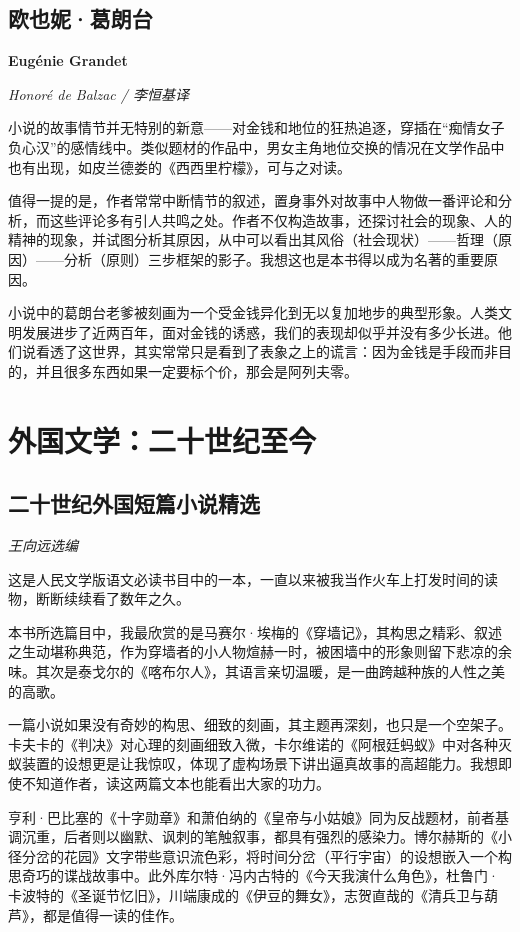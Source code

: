 \subsection*{欧也妮·葛朗台}
\par \textbf{Eugénie Grandet}
\par \emph{Honoré de Balzac / 李恒基译} 
\par 小说的故事情节并无特别的新意——对金钱和地位的狂热追逐，穿插在“痴情女子负心汉”的感情线中。类似题材的作品中，男女主角地位交换的情况在文学作品中也有出现，如皮兰德娄的《西西里柠檬》，可与之对读。
\par 值得一提的是，作者常常中断情节的叙述，置身事外对故事中人物做一番评论和分析，而这些评论多有引人共鸣之处。作者不仅构造故事，还探讨社会的现象、人的精神的现象，并试图分析其原因，从中可以看出其风俗（社会现状）——哲理（原因）——分析（原则）三步框架的影子。我想这也是本书得以成为名著的重要原因。
\par 小说中的葛朗台老爹被刻画为一个受金钱异化到无以复加地步的典型形象。人类文明发展进步了近两百年，面对金钱的诱惑，我们的表现却似乎并没有多少长进。他们说看透了这世界，其实常常只是看到了表象之上的谎言：因为金钱是手段而非目的，并且很多东西如果一定要标个价，那会是阿列夫零。
\par {}

\section{外国文学：二十世纪至今}

\subsection*{二十世纪外国短篇小说精选}
\par \emph{王向远选编}

\par 这是人民文学版语文必读书目中的一本，一直以来被我当作火车上打发时间的读物，断断续续看了数年之久。
\par 本书所选篇目中，我最欣赏的是马赛尔·埃梅的《穿墙记》，其构思之精彩、叙述之生动堪称典范，作为穿墙者的小人物煊赫一时，被困墙中的形象则留下悲凉的余味。其次是泰戈尔的《喀布尔人》，其语言亲切温暖，是一曲跨越种族的人性之美的高歌。
\par 一篇小说如果没有奇妙的构思、细致的刻画，其主题再深刻，也只是一个空架子。卡夫卡的《判决》对心理的刻画细致入微，卡尔维诺的《阿根廷蚂蚁》中对各种灭蚁装置的设想更是让我惊叹，体现了虚构场景下讲出逼真故事的高超能力。我想即使不知道作者，读这两篇文本也能看出大家的功力。
\par 亨利·巴比塞的《十字勋章》和萧伯纳的《皇帝与小姑娘》同为反战题材，前者基调沉重，后者则以幽默、讽刺的笔触叙事，都具有强烈的感染力。博尔赫斯的《小径分岔的花园》文字带些意识流色彩，将时间分岔（平行宇宙）的设想嵌入一个构思奇巧的谍战故事中。此外库尔特·冯内古特的《今天我演什么角色》，杜鲁门·卡波特的《圣诞节忆旧》，川端康成的《伊豆的舞女》，志贺直哉的《清兵卫与葫芦》，都是值得一读的佳作。
\par {}

